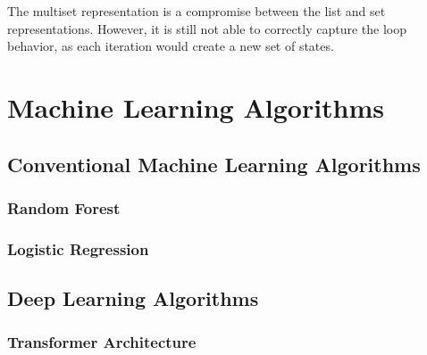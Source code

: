 The multiset representation is a compromise between the list and set representations. However, it is still not able to correctly capture the loop behavior, as each iteration would create a new set of states.

\section{Machine Learning Algorithms}

\subsection{Conventional Machine Learning Algorithms}

\subsubsection*{Random Forest}
\subsubsection*{Logistic Regression}

\subsection{Deep Learning Algorithms}

\subsubsection*{Transformer Architecture}






\begin{comment}
    \begin{definition}[Directly-Follows Graph]
    
\end{definition}

\begin{definition}[Finally-Follows Graph]
    
\end{definition}

\begin{definition}[Non-local dependency]
    
\end{definition}

\begin{definition}[Mining Non-local dependencies]
    
\end{definition}

\end{comment}



\begin{comment}
    Limitations of translucent logs: Cannot solve the problem of non-local dependencies, as there are non-free-choice nets that are not lucent. However: Translucent event logs function as a safeguard to differentiate non-local dependencies from the local dependencies in a potentially incomplete event log.
\end{comment}
